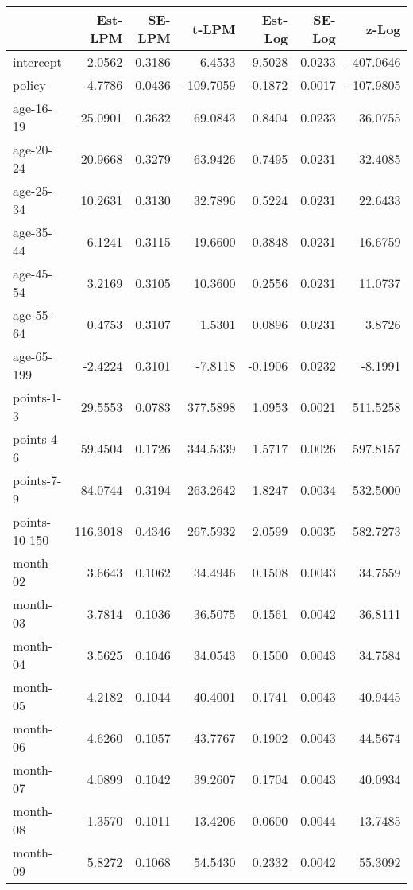 \documentclass[10pt]{article}
\begin{document}
\begin{table}[ht]
\centering
\begin{tabular}{lrrrrrr}
  \hline
 & Est-LPM & SE-LPM & t-LPM & Est-Log & SE-Log & z-Log \\ 
  \hline
intercept & 2.0562 & 0.3186 & 6.4533 & -9.5028 & 0.0233 & -407.0646 \\ 
  policy & -4.7786 & 0.0436 & -109.7059 & -0.1872 & 0.0017 & -107.9805 \\ 
  age-16-19 & 25.0901 & 0.3632 & 69.0843 & 0.8404 & 0.0233 & 36.0755 \\ 
  age-20-24 & 20.9668 & 0.3279 & 63.9426 & 0.7495 & 0.0231 & 32.4085 \\ 
  age-25-34 & 10.2631 & 0.3130 & 32.7896 & 0.5224 & 0.0231 & 22.6433 \\ 
  age-35-44 & 6.1241 & 0.3115 & 19.6600 & 0.3848 & 0.0231 & 16.6759 \\ 
  age-45-54 & 3.2169 & 0.3105 & 10.3600 & 0.2556 & 0.0231 & 11.0737 \\ 
  age-55-64 & 0.4753 & 0.3107 & 1.5301 & 0.0896 & 0.0231 & 3.8726 \\ 
  age-65-199 & -2.4224 & 0.3101 & -7.8118 & -0.1906 & 0.0232 & -8.1991 \\ 
  points-1-3 & 29.5553 & 0.0783 & 377.5898 & 1.0953 & 0.0021 & 511.5258 \\ 
  points-4-6 & 59.4504 & 0.1726 & 344.5339 & 1.5717 & 0.0026 & 597.8157 \\ 
  points-7-9 & 84.0744 & 0.3194 & 263.2642 & 1.8247 & 0.0034 & 532.5000 \\ 
  points-10-150 & 116.3018 & 0.4346 & 267.5932 & 2.0599 & 0.0035 & 582.7273 \\ 
  month-02 & 3.6643 & 0.1062 & 34.4946 & 0.1508 & 0.0043 & 34.7559 \\ 
  month-03 & 3.7814 & 0.1036 & 36.5075 & 0.1561 & 0.0042 & 36.8111 \\ 
  month-04 & 3.5625 & 0.1046 & 34.0543 & 0.1500 & 0.0043 & 34.7584 \\ 
  month-05 & 4.2182 & 0.1044 & 40.4001 & 0.1741 & 0.0043 & 40.9445 \\ 
  month-06 & 4.6260 & 0.1057 & 43.7767 & 0.1902 & 0.0043 & 44.5674 \\ 
  month-07 & 4.0899 & 0.1042 & 39.2607 & 0.1704 & 0.0043 & 40.0934 \\ 
  month-08 & 1.3570 & 0.1011 & 13.4206 & 0.0600 & 0.0044 & 13.7485 \\ 
  month-09 & 5.8272 & 0.1068 & 54.5430 & 0.2332 & 0.0042 & 55.3092 \\ 

\end{tabular}
\end{table}
\end{document}
